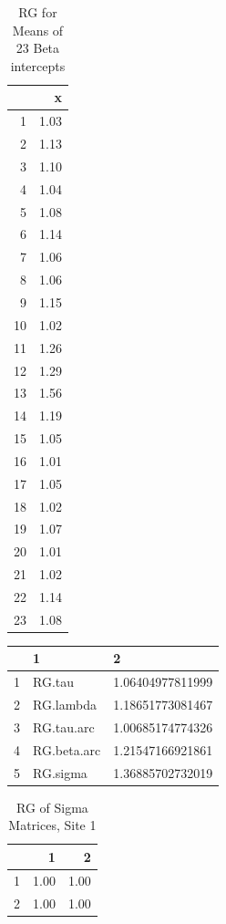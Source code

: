 \documentclass[11pt]{article}
\begin{document}
\begin{table}[ht]\caption{RG for Means of 23 Beta intercepts}
\centering
\begin{tabular}{rr}
  \hline
 & x \\ 
  \hline
1 & 1.03 \\ 
  2 & 1.13 \\ 
  3 & 1.10 \\ 
  4 & 1.04 \\ 
  5 & 1.08 \\ 
  6 & 1.14 \\ 
  7 & 1.06 \\ 
  8 & 1.06 \\ 
  9 & 1.15 \\ 
  10 & 1.02 \\ 
  11 & 1.26 \\ 
  12 & 1.29 \\ 
  13 & 1.56 \\ 
  14 & 1.19 \\ 
  15 & 1.05 \\ 
  16 & 1.01 \\ 
  17 & 1.05 \\ 
  18 & 1.02 \\ 
  19 & 1.07 \\ 
  20 & 1.01 \\ 
  21 & 1.02 \\ 
  22 & 1.14 \\ 
  23 & 1.08 \\ 
   \hline
\end{tabular}
\end{table}

\begin{table}[ht]
\centering
\begin{tabular}{rll}
  \hline
 & 1 & 2 \\ 
  \hline
1 & RG.tau & 1.06404977811999 \\ 
  2 & RG.lambda & 1.18651773081467 \\ 
  3 & RG.tau.arc & 1.00685174774326 \\ 
  4 & RG.beta.arc & 1.21547166921861 \\ 
  5 & RG.sigma & 1.36885702732019 \\ 
   \hline
\end{tabular}
\end{table}



\begin{table}[ht]\caption{RG of Sigma Matrices, Site 1}
\centering
\begin{tabular}{rrr}
  \hline
 & 1 & 2 \\ 
  \hline
1 & 1.00 & 1.00 \\ 
  2 & 1.00 & 1.00 \\ 
   \hline
\end{tabular}
\end{table}
\end{document}

